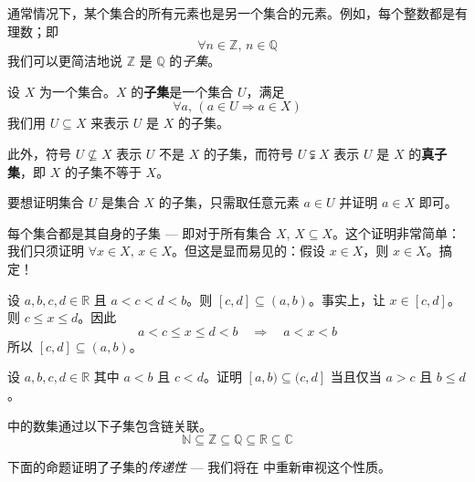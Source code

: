 通常情况下，某个集合的所有元素也是另一个集合的元素。例如，每个整数都是有理数；即
\[ \forall n \in \mathbb{Z},\, n \in \mathbb{Q} \]
我们可以更简洁地说 $\mathbb{Z}$ 是 $\mathbb{Q}$ 的\textit{子集}。

\begin{definition}
\label{defSubset}
设 $X$ 为一个集合。$X$ 的\textbf{子集}是一个集合 $U$，满足
\[ \forall a,\, (a \in U \Rightarrow a \in X) \]
我们用 $U \subseteq X$  来表示 $U$ 是 $X$ 的子集。

此外，符号 $U \nsubseteq X$  表示 $U$ 不是 $X$ 的子集，而符号 $U \subsetneqq X$  表示 $U$ 是 $X$ 的\textbf{真子集}，即 $X$ 的子集不等于 $X$。
\end{definition}

\begin{strategy}[证明子集包含]
要想证明集合 $U$ 是集合 $X$ 的子集，只需取任意元素 $a \in U$ 并证明 $a \in X$ 即可。
\end{strategy}

\begin{example}
每个集合都是其自身的子集 --- 即对于所有集合 $X$, $X \subseteq X$。这个证明非常简单：我们只须证明  $\forall x \in X,\, x \in X$。但这是显而易见的：假设 $x \in X$，则 $x \in X$。搞定！
\end{example}

\begin{example}
设 $a,b,c,d \in \mathbb{R}$ 且 $a<c<d<b$。则 $[c,d] \subseteq (a,b)$。事实上，让 $x \in [c,d]$。 则 $c \le x \le d$。因此
\[ a < c \le x \le d < b \quad \Rightarrow \quad a < x < b \]
所以 $[c,d] \subseteq (a,b)$。
\end{example}

\begin{exercise}
设 $a,b,c,d \in \mathbb{R}$ 其中 $a<b$ 且 $c<d$。证明 $[a,b) \subseteq (c,d]$ 当且仅当 $a > c$ 且 $b \le d$。
\end{exercise}

\begin{example}
 中的数集通过以下子集包含链关联。
\[ \mathbb{N} \subseteq \mathbb{Z} \subseteq \mathbb{Q} \subseteq \mathbb{R} \subseteq \mathbb{C} \]
\end{example}

下面的命题证明了子集的\textit{传递性} --- 我们将在  中重新审视这个性质。

